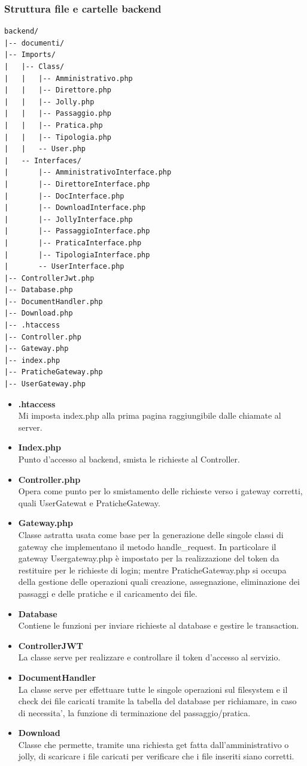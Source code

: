 \documentclass{article}
\begin{document}
\subsubsection{Struttura file e cartelle backend}
\begin{verbatim}
backend/
|-- documenti/
|-- Imports/
|   |-- Class/
|   |   |-- Amministrativo.php
|   |   |-- Direttore.php
|   |   |-- Jolly.php
|   |   |-- Passaggio.php
|   |   |-- Pratica.php
|   |   |-- Tipologia.php
|   |   -- User.php
|   -- Interfaces/
|       |-- AmministrativoInterface.php
|       |-- DirettoreInterface.php
|       |-- DocInterface.php
|       |-- DownloadInterface.php
|       |-- JollyInterface.php
|       |-- PassaggioInterface.php
|       |-- PraticaInterface.php
|       |-- TipologiaInterface.php
|       -- UserInterface.php
|-- ControllerJwt.php
|-- Database.php
|-- DocumentHandler.php
|-- Download.php
|-- .htaccess
|-- Controller.php
|-- Gateway.php
|-- index.php
|-- PraticheGateway.php
|-- UserGateway.php
\end{verbatim}

\begin{itemize}
    \item \textbf{.htaccess}\\
    Mi imposta index.php alla prima pagina raggiungibile dalle chiamate al server.
\item\textbf{Index.php}\\
Punto d'accesso al backend, smista le richieste al Controller.
\item\textbf{Controller.php}\\
Opera come punto per lo smistamento delle richieste verso i gateway corretti, quali UserGatewat e PraticheGateway.
\item\textbf{Gateway.php}\\
Classe astratta usata come base per la generazione delle singole classi di gateway che implementano il metodo handle\_request. In particolare il gateway Usergateway.php è impostato per la realizzazione del token da restituire per le richieste di login; mentre PraticheGateway.php si occupa della gestione delle operazioni quali  creazione, assegnazione, eliminazione dei passaggi e delle pratiche e il caricamento dei file.
\item\textbf{Database}\\
Contiene le funzioni per inviare richieste al database e gestire le transaction.
\item\textbf{ControllerJWT}\\
La classe serve per realizzare e controllare il token d'accesso al servizio.
\item \textbf{DocumentHandler}\\
La classe serve per effettuare tutte le singole operazioni sul filesystem e il check dei file caricati tramite la tabella del database per richiamare, in caso di necessita', la funzione di terminazione del passaggio/pratica.
\item \textbf{Download}\\
Classe che permette, tramite una richiesta get fatta dall'amministrativo o jolly, di scaricare i file caricati per verificare che i file inseriti siano corretti.
\end{itemize}
\end{document}
